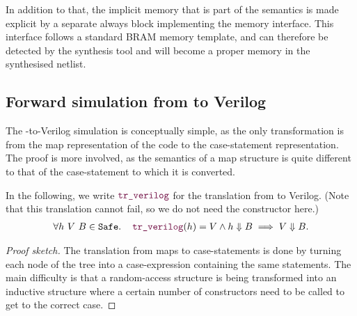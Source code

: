 In addition to that, the implicit memory that is part of the \htl{} semantics is
made explicit by a separate always block implementing the memory interface.
This interface follows a standard \gls{BRAM} memory template, and can therefore
be detected by the synthesis tool and will become a proper memory in the
synthesised netlist.

\subsection{Forward simulation from \htl{} to Verilog}%
\label{sec:proof:htl_verilog}

The \htl{}-to-Verilog simulation is conceptually simple, as the only
transformation is from the map representation of the code to the case-statement
representation.  The proof is more involved, as the semantics of a map structure
is quite different to that of the case-statement to which it is converted.

\begin{lemma}\label{lemma:verilog}
  In the following, we write $\yhfunction{tr\_verilog}$ for the translation from
  \htl{} to Verilog. (Note that this translation cannot fail, so we do not need the
   constructor here.)
  {\normalfont
    \begin{align*}
      \forall h\ V\ B \in \texttt{Safe}\ldotp\quad \yhfunction{tr\_verilog} (h) = V \land h \Downarrow B \implies V \Downarrow B.
    \end{align*}}
\end{lemma}

\begin{proof}[Proof sketch]
  The translation from maps to case-statements is done by turning each node of
  the tree into a case-expression containing the same statements.  The main
  difficulty is that a random-access structure is being transformed into an
  inductive structure where a certain number of constructors need to be called
  to get to the correct case.
\end{proof}

